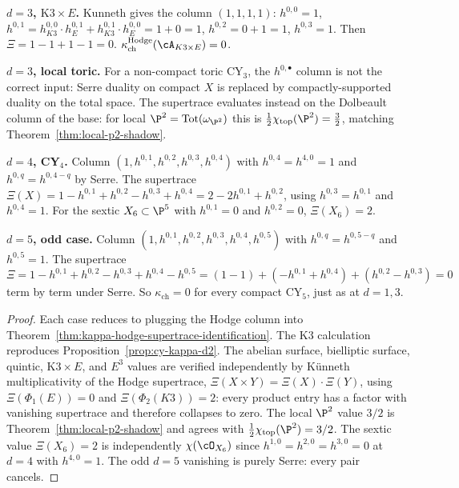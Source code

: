 \begin{theorem}
\textbf{$d = 3$, $\mathrm{K3} \times E$.} Kunneth gives the column
$(1, 1, 1, 1)$: $h^{0,0} = 1$, $h^{0,1} = h^{0,0}_{K3} \cdot h^{0,1}_E
+ h^{0,1}_{K3} \cdot h^{0,0}_E = 1 + 0 = 1$, $h^{0,2} = 0 + 1 = 1$,
$h^{0,3} = 1$. Then $\Xi = 1 - 1 + 1 - 1 = 0$.
$\kappa_{\mathrm{ch}}^{\mathrm{Hodge}}(\cA_{K3 \times E}) = 0$.

\textbf{$d = 3$, local toric.} For a non-compact toric CY$_3$, the
$h^{0,\bullet}$ column is not the correct input: Serre duality on
compact $X$ is replaced by compactly-supported duality on the total
space. The supertrace evaluates instead on the Dolbeault column of the
base: for local $\P^2 = \mathrm{Tot}(\omega_{\P^2})$ this is
$\frac{1}{2}\chi_{\mathrm{top}}(\P^2) = \frac{3}{2}$, matching
Theorem~\ref{thm:local-p2-shadow}.

\textbf{$d = 4$, CY$_4$.} Column $(1, h^{0,1}, h^{0,2}, h^{0,3},
h^{0,4})$ with $h^{0,4} = h^{4,0} = 1$ and $h^{0,q} = h^{0,4-q}$ by
Serre. The supertrace $\Xi(X) = 1 - h^{0,1} + h^{0,2} - h^{0,3} +
h^{0,4} = 2 - 2 h^{0,1} + h^{0,2}$, using $h^{0,3} = h^{0,1}$ and
$h^{0,4} = 1$. For the sextic $X_6 \subset \P^5$ with $h^{0,1} = 0$ and
$h^{0,2} = 0$, $\Xi(X_6) = 2$.

\textbf{$d = 5$, odd case.} Column $(1, h^{0,1}, h^{0,2}, h^{0,3},
h^{0,4}, h^{0,5})$ with $h^{0,q} = h^{0,5-q}$ and $h^{0,5} = 1$. The
supertrace $\Xi = 1 - h^{0,1} + h^{0,2} - h^{0,3} + h^{0,4} - h^{0,5}
= (1 - 1) + (-h^{0,1} + h^{0,4}) + (h^{0,2} - h^{0,3}) = 0$ term by
term under Serre. So $\kappa_{\mathrm{ch}} = 0$ for every compact
CY$_5$, just as at $d = 1, 3$.
\end{theorem}

\begin{proof}
Each case reduces to plugging the Hodge column into
Theorem~\ref{thm:kappa-hodge-supertrace-identification}. The K3
calculation reproduces Proposition~\ref{prop:cy-kappa-d2}. The abelian
surface, bielliptic surface, quintic, $\mathrm{K3} \times E$, and
$E^3$ values are verified independently by K\"unneth multiplicativity of
the Hodge supertrace,
$\Xi(X \times Y) = \Xi(X) \cdot \Xi(Y)$, using
$\Xi(\Phi_1(E)) = 0$ and $\Xi(\Phi_2(K3)) = 2$: every product entry has a
factor with vanishing supertrace and therefore collapses to zero.
The local $\P^2$ value $3/2$ is Theorem~\ref{thm:local-p2-shadow} and
agrees with $\frac{1}{2}\chi_{\mathrm{top}}(\P^2) = 3/2$. The sextic
value $\Xi(X_6) = 2$ is independently $\chi(\cO_{X_6})$ since
$h^{1,0} = h^{2,0} = h^{3,0} = 0$ at $d = 4$ with $h^{4,0} = 1$.
The odd $d = 5$ vanishing is purely Serre: every pair cancels.
\end{proof}

